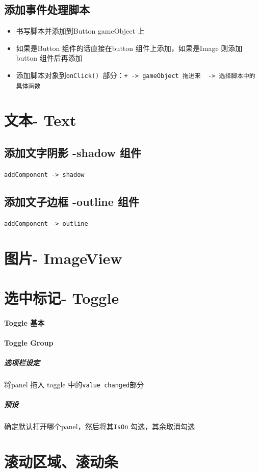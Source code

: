 \documentclass[UTF8,a4paper,12pt]{ctexbook}
\begin{document}
		\subsection{添加事件处理脚本}
			\begin{itemize}
				\item 书写脚本并添加到Button gameObject 上
				\item 如果是Button 组件的话直接在button 组件上添加，如果是Image 则添加button 组件后再添加
				\item  添加脚本对象到\verb|onClick() |部分：\verb|+ -> gameObject 拖进来  -> 选择脚本中的具体函数|
			\end{itemize}
		
	\section{文本- Text}
		\subsection{添加文字阴影 -shadow 组件}
			\verb|addComponent -> shadow|
			
		\subsection{添加文子边框 -outline 组件}
			\verb|addComponent -> outline|
			
	\section{图片- ImageView}
		
	\section{选中标记- Toggle}
		\paragraph{Toggle 基本}
		
		\paragraph{Toggle Group}
			\subparagraph{选项栏设定}
				将panel  拖入 toggle 中的\verb|value changed|部分
				
			\subparagraph{预设}
				确定默认打开哪个panel，然后将其\verb|IsOn| 勾选，其余取消勾选	
				
	\section{滚动区域、滚动条}
	
\end{document}
